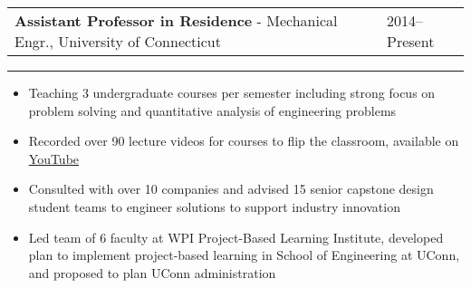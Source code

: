 \documentclass[11pt]{article}
\newenvironment{cvevent}[3]{%
%
\begin{tabular*}{1\textwidth}{p{13.9cm} x{3.04cm}}%
    \textbf{#2} - \textcolor{bgcol}{#3} & \vspace{2.5pt}\textcolor{sectcol}{#1}%
\end{tabular*}%

\vspace{-8pt}%
\textcolor{softcol}{\hrule}%
\vspace{6pt}%
}{
\vspace{6pt}
}
\begin{document}
\begin{cvevent}{2014--Present}%
{Assistant Professor in Residence}%
{Mechanical Engr., University of Connecticut}%
\begin{itemize}
    \item Teaching 3 undergraduate courses per semester including strong focus on problem
    solving and quantitative analysis of engineering problems
    \item Recorded over 90 lecture videos for courses to flip the classroom, available on
    \href{https://www.youtube.com/playlist?list=PLnOxmF4n89SXsKxFb6ug0ThMNpqJST5_X}{YouTube}
    \item Consulted with over 10 companies and advised 15 senior capstone design student
    teams to engineer solutions to support industry innovation
    \item Led team of 6 faculty at WPI Project-Based Learning Institute, developed
    plan to implement project-based learning in School of Engineering at UConn, and
    proposed to plan UConn administration
\end{itemize}
\end{cvevent}
\end{document}
